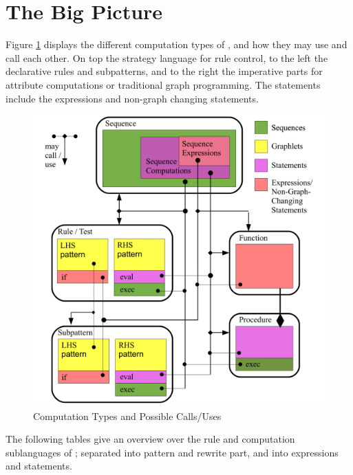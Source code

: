 \section{The Big Picture}
Figure \ref{figcomptypescallsuses} displays the different computation types of \GrG, and how they may use and call each other. On top the strategy language for rule control, to the left the declarative rules and subpatterns, and to the right the imperative parts for attribute computations or traditional graph programming. The statements include the expressions and non-graph changing statements.

\begin{figure}[hptb]
  \centering
  \includegraphics[width=1.0\textwidth]{fig/ComputationContainmentAndCallability}
  \caption{Computation Types and Possible Calls/Uses}
  \label{figcomptypescallsuses}
\end{figure}

The following tables give an overview over the rule and computation sublanguages of \GrG;
separated into pattern and rewrite part, and into expressions and statements.

